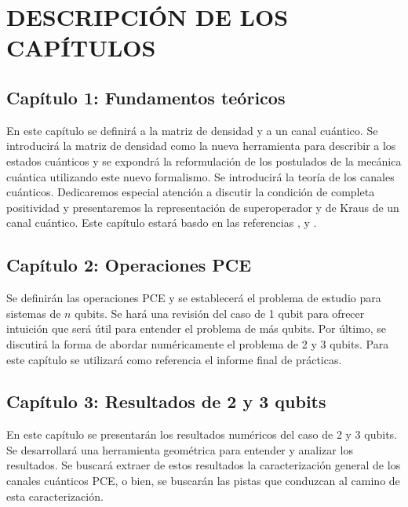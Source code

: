 \chapter{DESCRIPCIÓN DE LOS CAPÍTULOS}

\section*{Capítulo 1: Fundamentos teóricos}
En este capítulo se definirá a la matriz de densidad y a un canal cuántico. 
Se introducirá la matriz de densidad como la nueva herramienta para 
describir a los estados cuánticos y se expondrá la reformulación de 
los postulados de la mecánica cuántica utilizando este nuevo formalismo.
Se introducirá la teoría de los canales cuánticos. Dedicaremos especial 
atención a discutir la condición de completa positividad y presentaremos 
la representación de superoperador y de Kraus de un canal cuántico.
Este capítulo estará basdo en las referencias \cite{bengtsson_zyczkowski_2017},
\cite{nielsen_chuang_2011} y \cite{sakurai_napolitano_2017}.

\section*{Capítulo 2: Operaciones PCE}
Se definirán las operaciones PCE y se establecerá el problema de 
estudio para sistemas de $n$ qubits. Se hará una revisión del caso 
de 1 qubit para ofrecer intuición que será útil para entender el 
problema de más qubits. Por último, se discutirá la forma de 
abordar numéricamente el problema de 2 y 3 qubits. Para este
capítulo se utilizará como referencia el informe final de prácticas.

\section*{Capítulo 3: Resultados de 2 y 3 qubits}
En este capítulo se presentarán los resultados numéricos del 
caso de 2 y 3 qubits. Se desarrollará una herramienta geométrica 
para entender y analizar los resultados. Se buscará extraer de 
estos resultados la caracterización general de los canales cuánticos PCE,
o bien, se buscarán las pistas que conduzcan al camino de esta caracterización.

